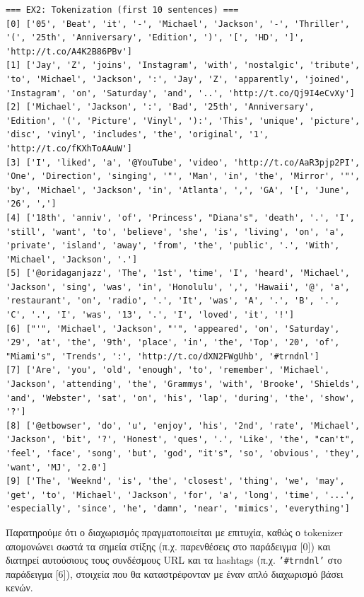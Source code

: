 \documentclass[12pt]{article}
\begin{document}
\begin{lstlisting}[language={}, basicstyle=\ttfamily\scriptsize]
=== EX2: Tokenization (first 10 sentences) ===
[0] ['05', 'Beat', 'it', '-', 'Michael', 'Jackson', '-', 'Thriller', '(', '25th', 'Anniversary', 'Edition', ')', '[', 'HD', ']', 'http://t.co/A4K2B86PBv']
[1] ['Jay', 'Z', 'joins', 'Instagram', 'with', 'nostalgic', 'tribute', 'to', 'Michael', 'Jackson', ':', 'Jay', 'Z', 'apparently', 'joined', 'Instagram', 'on', 'Saturday', 'and', '..', 'http://t.co/Qj9I4eCvXy']
[2] ['Michael', 'Jackson', ':', 'Bad', '25th', 'Anniversary', 'Edition', '(', 'Picture', 'Vinyl', '):', 'This', 'unique', 'picture', 'disc', 'vinyl', 'includes', 'the', 'original', '1', 'http://t.co/fKXhToAAuW']
[3] ['I', 'liked', 'a', '@YouTube', 'video', 'http://t.co/AaR3pjp2PI', 'One', 'Direction', 'singing', '"', 'Man', 'in', 'the', 'Mirror', '"', 'by', 'Michael', 'Jackson', 'in', 'Atlanta', ',', 'GA', '[', 'June', '26', ',']
[4] ['18th', 'anniv', 'of', 'Princess', "Diana's", 'death', '.', 'I', 'still', 'want', 'to', 'believe', 'she', 'is', 'living', 'on', 'a', 'private', 'island', 'away', 'from', 'the', 'public', '.', 'With', 'Michael', 'Jackson', '.']
[5] ['@oridaganjazz', 'The', '1st', 'time', 'I', 'heard', 'Michael', 'Jackson', 'sing', 'was', 'in', 'Honolulu', ',', 'Hawaii', '@', 'a', 'restaurant', 'on', 'radio', '.', 'It', 'was', 'A', '.', 'B', '.', 'C', '.', 'I', 'was', '13', '.', 'I', 'loved', 'it', '!']
[6] ["'", 'Michael', 'Jackson', "'", 'appeared', 'on', 'Saturday', '29', 'at', 'the', '9th', 'place', 'in', 'the', 'Top', '20', 'of', "Miami's", 'Trends', ':', 'http://t.co/dXN2FWgUhb', '#trndnl']
[7] ['Are', 'you', 'old', 'enough', 'to', 'remember', 'Michael', 'Jackson', 'attending', 'the', 'Grammys', 'with', 'Brooke', 'Shields', 'and', 'Webster', 'sat', 'on', 'his', 'lap', 'during', 'the', 'show', '?']
[8] ['@etbowser', 'do', 'u', 'enjoy', 'his', '2nd', 'rate', 'Michael', 'Jackson', 'bit', '?', 'Honest', 'ques', '.', 'Like', 'the', "can't", 'feel', 'face', 'song', 'but', 'god', "it's", 'so', 'obvious', 'they', 'want', 'MJ', '2.0']
[9] ['The', 'Weeknd', 'is', 'the', 'closest', 'thing', 'we', 'may', 'get', 'to', 'Michael', 'Jackson', 'for', 'a', 'long', 'time', '...', 'especially', 'since', 'he', 'damn', 'near', 'mimics', 'everything']
\end{lstlisting}

Παρατηρούμε ότι ο διαχωρισμός πραγματοποιείται με επιτυχία, καθώς ο tokenizer απομονώνει σωστά τα σημεία στίξης (π.χ. παρενθέσεις στο παράδειγμα [0]) και διατηρεί αυτούσιους τους συνδέσμους URL και τα hashtags (π.χ. \texttt{'\#trndnl'} στο παράδειγμα [6]), στοιχεία που θα καταστρέφονταν με έναν απλό διαχωρισμό βάσει κενών.
\end{document}
